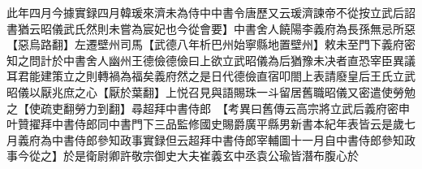 此年四月今據實録四月韓瑗來濟未為侍中中書令唐歷又云瑗濟諫帝不從按立武后詔書猶云昭儀武氏然則未嘗為宸妃也今從會要】中書舍人饒陽李義府為長孫無忌所惡【惡烏路翻】左遷壁州司馬【武德八年析巴州始寧縣地置壁州】敕未至門下義府密知之問計於中書舍人幽州王德儉德儉曰上欲立武昭儀為后猶豫未决者直恐宰臣異議耳君能建策立之則轉禍為福矣義府然之是日代德儉直宿叩閤上表請廢皇后王氏立武昭儀以厭兆庶之心【厭於葉翻】上悦召見與語賜珠一斗留居舊職昭儀又密遣使勞勉之【使疏吏翻勞力到翻】尋超拜中書侍郎　【考異曰舊傳云高宗將立武后義府密申叶贊擢拜中書侍郎同中書門下三品監修國史賜爵廣平縣男新書本紀年表皆云是歲七月義府為中書侍郎參知政事實録但云超拜中書侍郎宰輔圖十一月自中書侍郎參知政事今從之】於是衛尉卿許敬宗御史大夫崔義玄中丞袁公瑜皆潛布腹心於